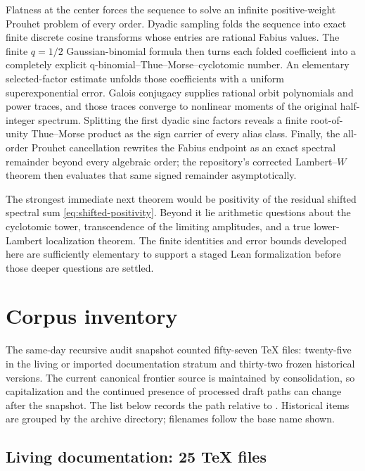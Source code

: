 \documentclass[11pt,oneside]{article}
\theoremstyle{definition}
\theoremstyle{remark}
\begin{document}
Flatness at the center forces the sequence to solve an infinite positive-weight
Prouhet problem of every order.  Dyadic sampling folds the sequence into exact
finite discrete cosine transforms whose entries are rational Fabius values.
The finite $q=1/2$ Gaussian-binomial formula then turns each folded coefficient
into a completely explicit q-binomial--Thue--Morse--cyclotomic number.  An
elementary selected-factor estimate unfolds those coefficients with a uniform
superexponential error.  Galois conjugacy supplies rational orbit polynomials
and power traces, and those traces converge to nonlinear moments of the original
half-integer spectrum.  Splitting the first dyadic sinc factors reveals a finite
root-of-unity Thue--Morse product as the sign carrier of every alias class.
Finally, the all-order Prouhet cancellation rewrites the Fabius endpoint as an
exact spectral remainder beyond every algebraic order; the repository's
corrected Lambert--$W$ theorem then evaluates that same signed remainder
asymptotically.

The strongest immediate next theorem would be positivity of the residual
shifted spectral sum \eqref{eq:shifted-positivity}.  Beyond it lie arithmetic
questions about the cyclotomic tower, transcendence of the limiting amplitudes,
and a true lower-Lambert localization theorem.  The finite identities and error
bounds developed here are sufficiently elementary to support a staged Lean
formalization before those deeper questions are settled.

\appendix

\section{Corpus inventory}\label{app:inventory}

The same-day recursive audit snapshot counted fifty-seven TeX files: twenty-five in the living or imported documentation stratum and thirty-two frozen historical versions.  The current canonical frontier source is maintained by consolidation, so capitalization and the continued presence of processed draft paths can change after the snapshot. The list below records the path
relative to . Historical items are grouped by
the archive directory; filenames follow the base name shown.

\subsection{Living documentation: 25 TeX files}
\end{document}
